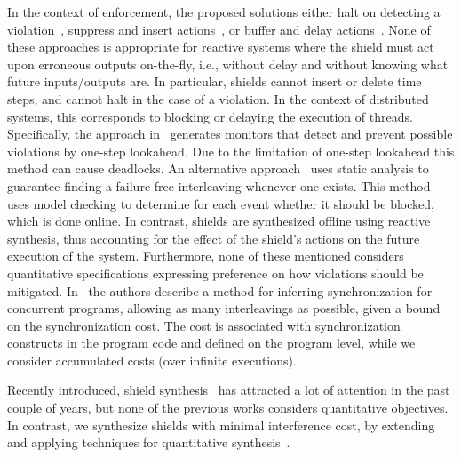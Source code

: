 In the context of enforcement, the proposed solutions either halt on detecting a violation~\cite{Schneider00}, suppress and insert actions~\cite{LigattiBW09}, or buffer and delay actions~\cite{FalconeFM12}.
None of these approaches is appropriate for reactive systems where the shield must act upon erroneous outputs on-the-fly, i.e.,
without delay and without knowing what future inputs/outputs are. In particular, shields cannot insert or delete time steps, and cannot halt in the case of a violation. In the context of distributed systems, this corresponds to blocking or delaying the execution of threads. Specifically, the approach in~\cite{LuoR13} generates monitors that detect  and prevent possible violations by one-step lookahead. Due to the limitation of one-step lookahead this method can cause deadlocks. An alternative approach~\cite{ZhangW14} uses static analysis to guarantee finding a failure-free interleaving whenever one exists. This method uses model checking to determine for each  event whether it should be blocked, which is done online. In contrast, shields are synthesized offline using reactive synthesis, thus accounting for the effect of the shield's  actions on the future execution of the system.
Furthermore, none of these mentioned considers quantitative specifications expressing preference on how violations should be mitigated. In~\cite{VechevYY09} the authors describe a method for inferring synchronization for concurrent programs, allowing as many interleavings as possible, given a bound on the synchronization cost. The cost is associated with synchronization constructs in the program code and defined on the program level, while we consider accumulated costs (over infinite executions).

Recently introduced, shield synthesis~\cite{BloemKKW15,KonighoferABHKT17} has attracted a lot of attention in the past couple of years, but none of the previous works considers quantitative objectives. In contrast, we synthesize shields with minimal interference cost, by extending and applying techniques for quantitative synthesis~\cite{jing2013}.



